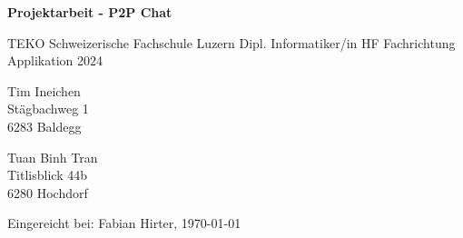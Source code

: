 \begin{titlepage}
    \centering
    \vspace*{1cm}
    
    \Huge
    \textbf{Projektarbeit - P2P Chat}
    
    \vspace{1.5cm}
    
    \LARGE
    TEKO Schweizerische Fachschule Luzern
    \Large
    Dipl. Informatiker/in HF Fachrichtung Applikation 2024

  
    \vspace{2cm}
    
    \begin{minipage}[t]{0.45\textwidth}
        \centering
        Tim Ineichen\\
        Stägbachweg 1\\
        6283 Baldegg
    \end{minipage}
    \begin{minipage}[t]{0.45\textwidth}
        \centering
        Tuan Binh Tran\\
        Titlisblick 44b\\
        6280 Hochdorf
    \end{minipage}

    
    \vfill
    
    \Large
    Eingereicht bei: Fabian Hirter, \today
    
\end{titlepage}
